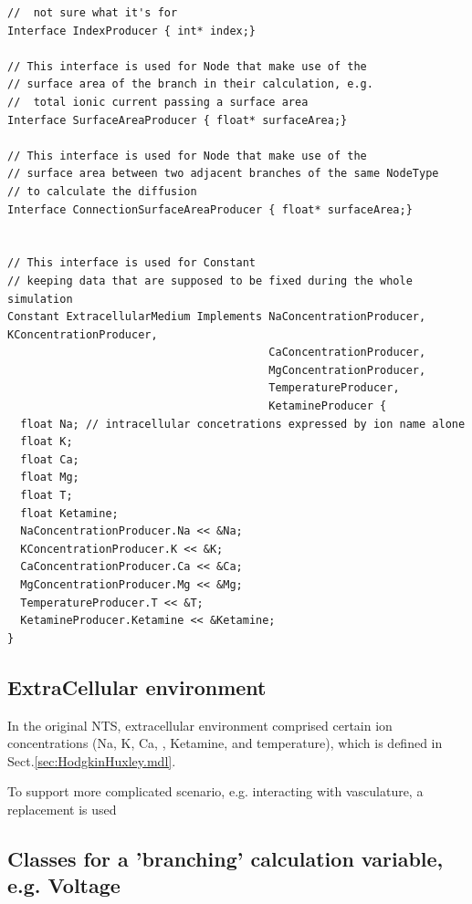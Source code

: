 {\begin{verbatim}
//  not sure what it's for
Interface IndexProducer { int* index;}

// This interface is used for Node that make use of the 
// surface area of the branch in their calculation, e.g. 
//  total ionic current passing a surface area
Interface SurfaceAreaProducer { float* surfaceArea;}

// This interface is used for Node that make use of the 
// surface area between two adjacent branches of the same NodeType
// to calculate the diffusion 
Interface ConnectionSurfaceAreaProducer { float* surfaceArea;}


// This interface is used for Constant
// keeping data that are supposed to be fixed during the whole simulation
Constant ExtracellularMedium Implements NaConcentrationProducer, KConcentrationProducer, 
                                        CaConcentrationProducer,
                                        MgConcentrationProducer,
                                        TemperatureProducer, 
                                        KetamineProducer {
  float Na; // intracellular concetrations expressed by ion name alone
  float K;
  float Ca;
  float Mg;
  float T;
  float Ketamine;
  NaConcentrationProducer.Na << &Na;
  KConcentrationProducer.K << &K;
  CaConcentrationProducer.Ca << &Ca;
  MgConcentrationProducer.Mg << &Mg;
  TemperatureProducer.T << &T;
  KetamineProducer.Ketamine << &Ketamine;
}
\end{verbatim}
}


\subsection{ExtraCellular environment}
\label{sec:NTS-extracellular-environment}

In the original NTS, extracellular environment comprised certain ion
concentrations (Na, K, Ca, , Ketamine, and temperature), which is
defined in Sect.\ref{sec:HodgkinHuxley.mdl}.

To support more complicated scenario, e.g. interacting with vasculature, a
replacement is used


\subsection{Classes for a 'branching' calculation variable, e.g. Voltage}




